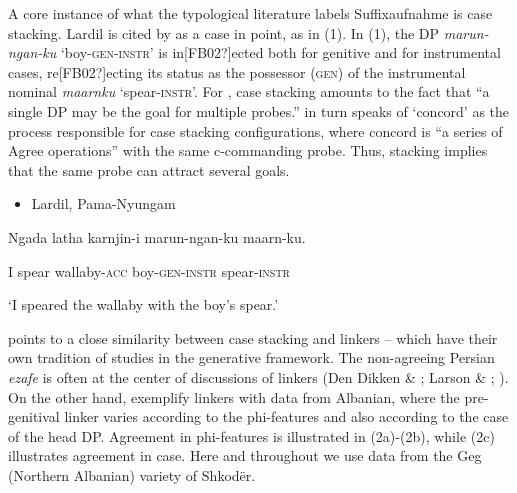 \documentclass[output=paper]{langsci/langscibook}
\begin{document}
\begin{styleSfondomedioiColorexxi}
A core instance of what the typological literature labels Suffixaufnahme \citep{Plank1995} is case stacking. Lardil is cited by \citet{Richards2013} as a case in point, as in (1). In (1), the DP \textit{marun-ngan-ku} ‘boy-\textsc{gen-instr}’ is in[FB02?]ected both for genitive and for instrumental cases, re[FB02?]ecting its status as the possessor (\textsc{gen}) of the instrumental nominal \textit{maarnku} ‘spear-\textsc{instr}’. For \citet[62]{Merchant2006}, case stacking amounts to the fact that “a single DP may be the goal for multiple probes.” \citet{Richards2013} in turn speaks of ‘concord’ as the process responsible for case stacking configurations, where concord is “a series of Agree operations” with the same c-commanding probe. Thus, stacking implies that the same probe can attract several goals.
\end{styleSfondomedioiColorexxi}

\begin{itemize}
\item \begin{styleSfondomedioiColorexxi}
Lardil, Pama-Nyungam \citep[43]{Richards2013}
\end{styleSfondomedioiColorexxi}\end{itemize}
\begin{styleSfondomedioiColorexxi}
Ngada latha   karnjin-i   marun-ngan-ku   maarn-ku.   
\end{styleSfondomedioiColorexxi}

\begin{styleSfondomedioiColorexxi}
I   spear   wallaby-\textsc{acc} boy-\textsc{gen-instr}  spear-\textsc{instr}
\end{styleSfondomedioiColorexxi}

\begin{styleSfondomedioiColorexxi}
‘I speared the wallaby with the boy’s spear.’        
\end{styleSfondomedioiColorexxi}

\begin{styleSfondomedioiColorexxi}
\citet{Plank1995} points to a close similarity between case stacking and linkers – which have their own tradition of studies in the generative framework. The non-agreeing Persian \textit{ezafe} is often at the center of discussions of linkers (Den Dikken \& \citealt{Singhapreecha2004}; Larson \& \citealt{Yamakido2008}; \citealt{Richards2010}). On the other hand, \citet{FrancoEtAl2015} exemplify linkers with data from Albanian, where the pre-genitival linker varies according to the phi-features and also according to the case of the head DP. Agreement in phi-features is illustrated in (2a)-(2b), while (2c) illustrates agreement in case. Here and throughout we use data from the Geg (Northern Albanian) variety of Shkodër.
\end{styleSfondomedioiColorexxi}
\end{document}
